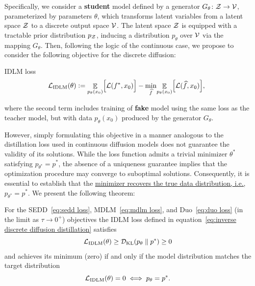  Specifically, we consider a \textbf{student} model defined by a generator ${G_{\theta}\colon \mathcal{Z} \to \mathcal{V}}$, parameterized by parameters $\theta$, which transforms latent variables from a latent space $\mathcal{Z}$ to a discrete output space $\mathcal{V}$. The latent space $\mathcal{Z}$ is equipped with a tractable prior distribution $p_{\mathcal{Z}}$, inducing a distribution $p_{\theta}$ over $\mathcal{V}$ via the mapping $G_{\theta}$. Then, following the logic of the continuous case, we propose to consider the following objective for the discrete diffusion:
\vspace{-1mm}
  \begin{Box1}{IDLM loss}
    \vspace{-2pt}
    \begin{equation}
      \label{eq:inverse discrete diffusion distillation}
      \!\!\!\! \LC_{\text{IDLM}}(\theta) \vcentcolon= \mathop{\EE}_{p_{\theta}(x_0)} \! \Big[\LC(f^*, x_0)\Big]
      - \min_{\widehat{f}}\! \mathop{\EE}_{p_{\theta}(x_0)}\! \Big[\LC(\widehat{f}, x_0)\Big],\!
    \end{equation}
  \end{Box1}
  where the second term includes training of \textbf{fake} model using the same loss as the teacher model, but with data $p_{\theta}(x_0)$ produced by the generator $G_{\theta}$.

  However, simply formulating this objective in a manner analogous to the distillation loss used in continuous
  diffusion models does not guarantee the validity of its solutions. While the loss function admits a trivial minimizer
$\theta^*$ satisfying $p_{\theta^*} = p^*$, the absence of a uniqueness guarantee implies that the optimization procedure
may converge to suboptimal solutions. Consequently, it is essential to establish that the
\underline{minimizer recovers the true data distribution, i.e., ${p_{\theta^*} = p^*}$}. We present the following
theorem:

  \begin{theorem}
  \label{thm:unique solution} 
    For the SEDD~\eqref{eq:sedd loss}, MDLM~\eqref{eq:mdlm loss}, and Duo~\eqref{eq:duo loss} (in the limit as $\tau \to 0^{+}$) objectives the IDLM loss defined in equation~\eqref{eq:inverse discrete diffusion distillation} satisfies
    \begin{equation}
      \mathcal{L}_{\text{IDLM}}(\theta) \geq \mathcal{D}_{\text{KL}}(p_{\theta} \parallel p^*)\geq 0 \nonumber
    \end{equation}
    and achieves its minimum (zero) if and only if the model distribution matches the target distribution
    \vspace{-2mm}
    \begin{equation}
      \mathcal{L}_{\text{IDLM}}(\theta) = 0 \iff p_{\theta} = p^*. \nonumber
    \end{equation}
    \vspace{-2mm}
  \end{theorem}
  \vspace{-5mm}

